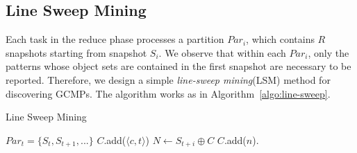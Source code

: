 
\subsection{Line Sweep Mining}
Each task in the reduce phase processes a partition $Par_i$, which contains
$R$ snapshots starting from snapshot $S_i$. We observe that within each $Par_i$, 
only the patterns whose object sets are contained in the first snapshot 
are necessary to be reported. Therefore, we design a simple 
\emph{line-sweep mining}(LSM) method for discovering
GCMPs. The algorithm works as in Algorithm~\ref{algo:line-sweep}.

\begin{algorithm}
\caption{Line Sweep Mining}
\label{algo:line-sweep}
\begin{algorithmic}[1]
\Require $Par_t = \{S_t, S_{t+1}, ...\}$
  \label{code:ls-can-set}
\label{code:ls-init-start}
\State $C$.add($\langle c, t \rangle $)
\EndFor
\label{code:ls-init-end}
\State $N \gets S_{t+i} \oplus C$ \label{code:ls-join}
			$C$.add($n$).
			\label{code:ls-add}
		\EndIf
	\EndFor
{}
	\label{code:ls-remove}
\EndFor
{}
\end{algorithmic}
\end{algorithm}

